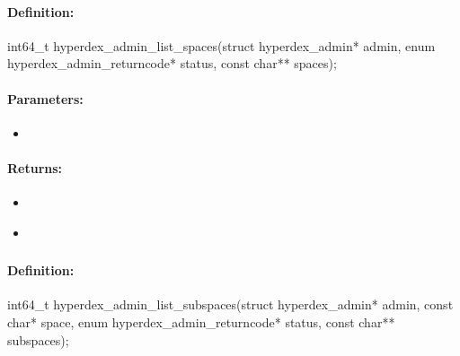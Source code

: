 \paragraph{Definition:}
\begin{ccode}
int64_t hyperdex_admin_list_spaces(struct hyperdex_admin* admin,
        enum hyperdex_admin_returncode* status,
        const char** spaces);
\end{ccode}

\paragraph{Parameters:}
\begin{itemize}[noitemsep]
\item {}\\

\end{itemize}

\paragraph{Returns:}
\begin{itemize}[noitemsep]
\item {}\\

\item {}\\

\end{itemize}

\pagebreak
\subsubsection{}
\label{api:c:list_subspaces}


\paragraph{Definition:}
\begin{ccode}
int64_t hyperdex_admin_list_subspaces(struct hyperdex_admin* admin,
        const char* space,
        enum hyperdex_admin_returncode* status,
        const char** subspaces);
\end{ccode}

